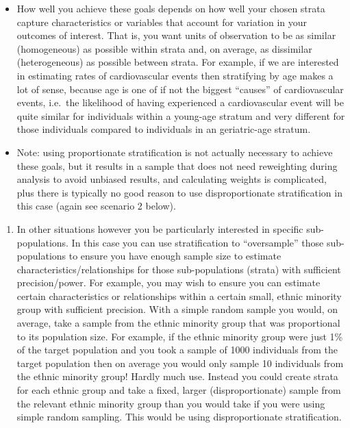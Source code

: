 \documentclass[
]{book}
\providecommand{\tightlist}{%
  \setlength{\itemsep}{0pt}\setlength{\parskip}{0pt}}
\begin{document}
\begin{itemize}
\item
  How well you achieve these goals depends on how well your chosen strata capture characteristics or variables that account for variation in your outcomes of interest. That is, you want units of observation to be as similar (homogeneous) as possible within strata and, on average, as dissimilar (heterogeneous) as possible between strata. For example, if we are interested in estimating rates of cardiovascular events then stratifying by age makes a lot of sense, because age is one of if not the biggest ``causes'' of cardiovascular events, i.e.~the likelihood of having experienced a cardiovascular event will be quite similar for individuals within a young-age stratum and very different for those individuals compared to individuals in an geriatric-age stratum.
\item
  Note: using proportionate stratification is not actually necessary to achieve these goals, but it results in a sample that does not need reweighting during analysis to avoid unbiased results, and calculating weights is complicated, plus there is typically no good reason to use disproportionate stratification in this case (again see scenario 2 below).
\end{itemize}

\begin{enumerate}
\def\labelenumi{\arabic{enumi}.}
\setcounter{enumi}{1}
\tightlist
\item
  In other situations however you be particularly interested in specific sub-populations. In this case you can use stratification to ``oversample'' those sub-populations to ensure you have enough sample size to estimate characteristics/relationships for those sub-populations (strata) with sufficient precision/power. For example, you may wish to ensure you can estimate certain characteristics or relationships within a certain small, ethnic minority group with sufficient precision. With a simple random sample you would, on average, take a sample from the ethnic minority group that was proportional to its population size. For example, if the ethnic minority group were just 1\% of the target population and you took a sample of 1000 individuals from the target population then on average you would only sample 10 individuals from the ethnic minority group! Hardly much use. Instead you could create strata for each ethnic group and take a fixed, larger (disproportionate) sample from the relevant ethnic minority group than you would take if you were using simple random sampling. This would be using disproportionate stratification.
\end{enumerate}
\end{document}
